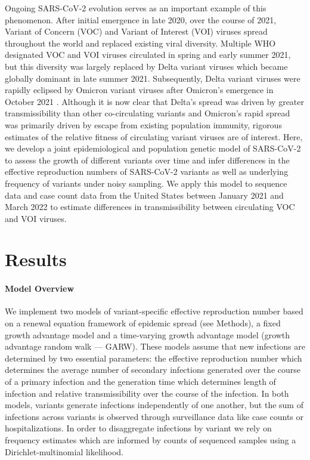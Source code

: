 Ongoing SARS-CoV-2 evolution serves as an important example of this phenomenon.
After initial emergence in late 2020, over the course of 2021, Variant of Concern (VOC) and Variant of Interest (VOI) viruses spread throughout the world and replaced existing viral diversity.
Multiple WHO designated \cite{Konings2021} VOC and VOI viruses circulated in spring and early summer 2021, but this diversity was largely replaced by Delta variant viruses which became globally dominant in late summer 2021.
Subsequently, Delta variant viruses were rapidly eclipsed by Omicron variant viruses after Omicron's emergence in October 2021 \cite{viana2022rapid}.
Although it is now clear that Delta's spread was driven by greater transmissibility than other co-circulating variants and Omicron's rapid spread was primarily driven by escape from existing population immunity, rigorous estimates of the relative fitness of circulating variant viruses are of interest.
Here, we develop a joint epidemiological and population genetic model of SARS-CoV-2 to assess the growth of different variants over time and infer differences in the effective reproduction numbers of SARS-CoV-2 variants as well as underlying frequency of variants under noisy sampling.
We apply this model to sequence data and case count data from the United States between January 2021 and March 2022 to estimate differences in transmissibility between circulating VOC and VOI viruses.

\section{Results}

\paragraph{Model Overview}%

We implement two models of variant-specific effective reproduction number based on a renewal equation framework of epidemic spread (see Methods), a fixed growth advantage model and a time-varying growth advantage model (growth advantage random walk --- GARW).
These models assume that new infections are determined by two essential parameters: the effective reproduction number which determines the average number of secondary infections generated over the course of a primary infection and the generation time which determines length of infection and relative transmissibility over the course of the infection.
In both models, variants generate infections independently of one another, but the sum of infections across variants is observed through surveillance data like case counts or hospitalizations.
In order to disaggregate infections by variant we rely on frequency estimates which are informed by counts of sequenced samples using a Dirichlet-multinomial likelihood.

